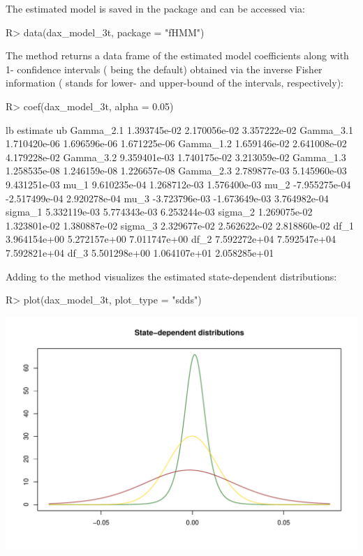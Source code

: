 \documentclass[article]{jss}
\newcommand{\fct}[1]{\code{#1()}}
\begin{document}
The estimated model is saved in the  package and can be accessed via:

%
\begin{Schunk}
\begin{Sinput}
R> data(dax_model_3t, package = "fHMM")
\end{Sinput}
\end{Schunk}
%

The \fct{coef} method returns a data frame of the estimated model coefficients along with 1- confidence intervals ( being the default) obtained via the inverse Fisher information ( stands for lower- and  upper-bound of the intervals, respectively):

%
\begin{Schunk}
\begin{Sinput}
R> coef(dax_model_3t, alpha = 0.05)
\end{Sinput}
\begin{Soutput}
                     lb      estimate           ub
Gamma_2.1  1.393745e-02  2.170056e-02 3.357222e-02
Gamma_3.1  1.710420e-06  1.696596e-06 1.671225e-06
Gamma_1.2  1.659146e-02  2.641008e-02 4.179228e-02
Gamma_3.2  9.359401e-03  1.740175e-02 3.213059e-02
Gamma_1.3  1.258535e-08  1.246159e-08 1.226657e-08
Gamma_2.3  2.789877e-03  5.145960e-03 9.431251e-03
mu_1       9.610235e-04  1.268712e-03 1.576400e-03
mu_2      -7.955275e-04 -2.517499e-04 2.920278e-04
mu_3      -3.723796e-03 -1.673649e-03 3.764982e-04
sigma_1    5.332119e-03  5.774343e-03 6.253244e-03
sigma_2    1.269075e-02  1.323801e-02 1.380887e-02
sigma_3    2.329677e-02  2.562622e-02 2.818860e-02
df_1       3.964154e+00  5.272157e+00 7.011747e+00
df_2       7.592272e+04  7.592547e+04 7.592821e+04
df_3       5.501298e+00  1.064107e+01 2.058285e+01
\end{Soutput}
\end{Schunk}
%

Adding  to the \fct{plot} method visualizes the estimated state-dependent distributions:

%
\begin{Schunk}
\begin{Sinput}
R> plot(dax_model_3t, plot_type = "sdds")
\end{Sinput}
\end{Schunk}
\includegraphics{fhmm_oelschlaeger_adam_michels-dax-sdds}
%
\end{document}
